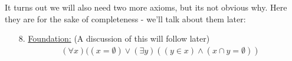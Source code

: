 \documentclass[10pt,a4paper]{article}
\begin{document}
It turns out we will also need two more axioms, but its not obvious why. Here they are for the sake of completeness - we'll talk about them later:
\begin{itemize}
\item[8.] \underline{Foundation:} (A discussion of this will follow later)
\begin{align*}
(\forall x)((x = \emptyset)\vee (\exists y)((y \in x)\wedge (x \cap y = \emptyset))\tag{Fdn}
\end{align*}
\end{itemize}
\end{document}
